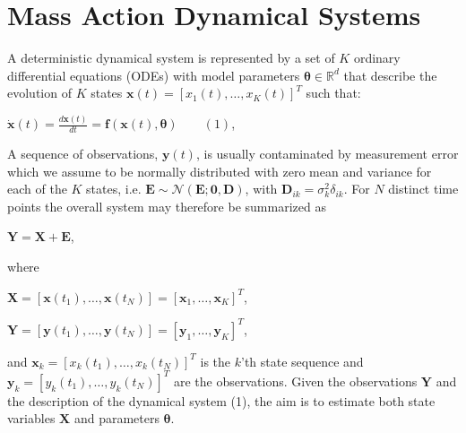 \section{Mass Action Dynamical Systems}

\begin{par}
A deterministic dynamical system is represented by a set of $K$ ordinary differential equations (ODEs) with model parameters $\boldsymbol\theta \in \mathbb{R}^d$ that describe the evolution of $K$ states $\mathbf{x}(t) = [x_1(t),\ldots, x_K(t)]^T$ such that:
\end{par} \vspace{1em}
\begin{par}
$\dot{\mathbf{x}}(t) = \frac{d \mathbf{x}(t)}{d t} = \mathbf{f}(\mathbf{x}(t),\boldsymbol\theta) \qquad (1)$,
\end{par} \vspace{1em}
\begin{par}
A sequence of observations, $\mathbf{y}(t)$, is usually contaminated by measurement error which we assume to be normally distributed with zero mean and variance for each of the $K$ states, i.e. $\mathbf{E}\sim\mathcal{N}(\mathbf{E};\mathbf{0},\mathbf{D})$, with $\mathbf{D}_{ik}=\sigma_k ^2 \delta_{ik}$. For $N$ distinct time points the overall system may therefore be summarized as
\end{par} \vspace{1em}
\begin{par}
$\mathbf{Y} = \mathbf{X} + \mathbf{E}$,
\end{par} \vspace{1em}
\begin{par}
where
\end{par} \vspace{1em}
\begin{par}
$\mathbf{X} = [\mathbf{x}(t_1),\ldots,\mathbf{x}(t_N)] =  [\mathbf{x}_1,\ldots,\mathbf{x}_K]^T$,
\end{par} \vspace{1em}
\begin{par}
$\mathbf{Y} = [\mathbf{y}(t_1),\ldots,\mathbf{y}(t_N)] =  [\mathbf{y}_1,\ldots,\mathbf{y}_K]^T$,
\end{par} \vspace{1em}
\begin{par}
and $\mathbf{x}_k = [x_k(t_1),\ldots,x_k(t_N)]^T$ is the $k$'th state sequence and $\mathbf{y}_k = [y_k(t_1),\ldots,y_k(t_N)]^T$ are the observations. Given the observations $\mathbf{Y}$ and the description of the dynamical system (1), the aim is to estimate both state variables $\mathbf{X}$ and parameters $\boldsymbol\theta$.
\end{par} \vspace{1em}
